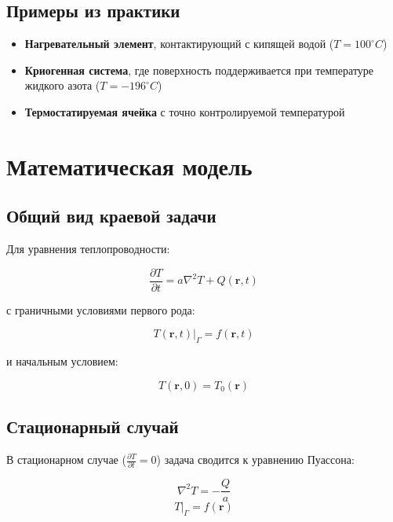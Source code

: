 \documentclass[12pt]{article}
\begin{document}
	\subsection{Примеры из практики}
	
	\begin{itemize}
		\item \textbf{Нагревательный элемент}, контактирующий с кипящей водой ($T = 100^\circ C$)
		\item \textbf{Криогенная система}, где поверхность поддерживается при температуре жидкого азота ($T = -196^\circ C$)
		\item \textbf{Термостатируемая ячейка} с точно контролируемой температурой
	\end{itemize}
	
	\section{Математическая модель}
	
	\subsection{Общий вид краевой задачи}
	
	Для уравнения теплопроводности:
	
	\[
	\frac{\partial T}{\partial t} = a \nabla^2 T + Q(\mathbf{r}, t)
	\]
	
	с граничными условиями первого рода:
	
	\[
	T(\mathbf{r}, t)|_{\Gamma} = f(\mathbf{r}, t)
	\]
	
	и начальным условием:
	
	\[
	T(\mathbf{r}, 0) = T_0(\mathbf{r})
	\]
	
	\subsection{Стационарный случай}
	
	В стационарном случае ($\frac{\partial T}{\partial t} = 0$) задача сводится к уравнению Пуассона:
	
	\[
	\nabla^2 T = -\frac{Q}{a}
	\]
	\[
	T|_{\Gamma} = f(\mathbf{r})
	\]
	
\end{document}
